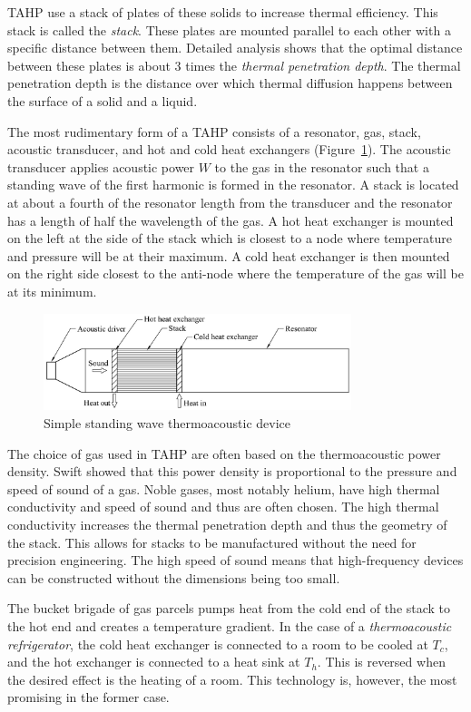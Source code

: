 \documentclass[a4paper]{article}
\newcommand{\newpara}
    {
      \bigbreak{}
      \noindent
    }
\begin{document}
\newpara{}
TAHP use a stack of plates of these solids to increase thermal efficiency. This stack is called the \emph{stack}. These plates are mounted parallel to each other with a specific distance between them. Detailed analysis shows that the optimal distance between these plates is about 3 times the \emph{thermal penetration depth}\cite{tijaniOptimalStack}. The thermal penetration depth is the distance over which thermal diffusion happens between the surface of a solid and a liquid.  %
\newpara{}
The most rudimentary form of a TAHP consists of a resonator, gas, stack, acoustic transducer, and hot and cold heat exchangers (Figure~\ref{tube}). The acoustic transducer applies acoustic power \(W\) to the gas in the resonator such that a standing wave of the first harmonic is formed in the resonator. A stack is located at about a fourth of the resonator length from the transducer and the resonator has a length of half the wavelength of the gas. A hot heat exchanger is mounted on the left at the side of the stack which is closest to a node where temperature and pressure will be at their maximum. A cold heat exchanger is then mounted on the right side closest to the anti-node where the temperature of the gas will be at its minimum.
\begin{figure}[ht]
  \centering
  \includegraphics[width=0.8\textwidth]{images/tube.png}
  \caption{Simple standing wave thermoacoustic device\cite{en14010083}}\label{tube}
\end{figure}
\newpara{}
The choice of gas used in TAHP are often based on the thermoacoustic power density. Swift showed that this power density is proportional to the pressure and speed of sound of a gas\cite{book}. Noble gases, most notably helium, have high thermal conductivity and speed of sound and thus are often chosen. The high thermal conductivity increases the thermal penetration depth and thus the geometry of the stack. This allows for stacks to be manufactured without the need for precision engineering. The high speed of sound means that high-frequency devices can be constructed without the dimensions being too small.
\newpara{}
The bucket brigade of gas parcels pumps heat from the cold end of the stack to the hot end and creates a temperature gradient. In the case of a \emph{thermoacoustic refrigerator}, the cold heat exchanger is connected to a room to be cooled at \(T_c\), and the hot exchanger is connected to a heat sink at \(T_h\). This is reversed when the desired effect is the heating of a room. This technology is, however, the most promising in the former case.
\end{document}
